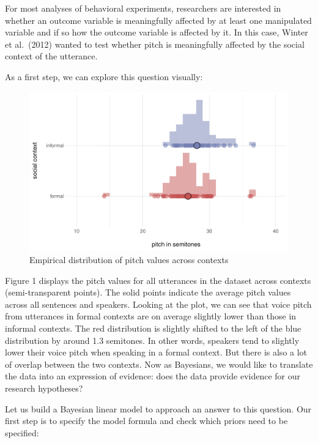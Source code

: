\documentclass[
  doc,
  longtable,
  nolmodern,
  notxfonts,
  notimes,
  colorlinks=true,linkcolor=blue,citecolor=blue,urlcolor=blue]{apa7}
\begin{document}
For most analyses of behavioral experiments, researchers are interested
in whether an outcome variable is meaningfully affected by at least one
manipulated variable and if so how the outcome variable is affected by
it. In this case, Winter et al.~(2012) wanted to test whether pitch is
meaningfully affected by the social context of the utterance.

As a first step, we can explore this question visually:

\begin{figure}[H]

\caption{Empirical distribution of pitch values across contexts}

{\centering \includegraphics{manuscript_files/figure-pdf/descriptive-dataviz-1.pdf}

}

\end{figure}%

Figure 1 displays the pitch values for all utterances in the dataset
across contexts (semi-transparent points). The solid points indicate the
average pitch values across all sentences and speakers. Looking at the
plot, we can see that voice pitch from utterances in formal contexts are
on average slightly lower than those in informal contexts. The red
distribution is slightly shifted to the left of the blue distribution by
around 1.3 semitones. In other words, speakers tend to slightly lower
their voice pitch when speaking in a formal context. But there is also a
lot of overlap between the two contexts. Now as Bayesians, we would like
to translate the data into an expression of evidence: does the data
provide evidence for our research hypotheses?

Let us build a Bayesian linear model to approach an answer to this
question. Our first step is to specify the model formula and check which
priors need to be specified:
\end{document}
